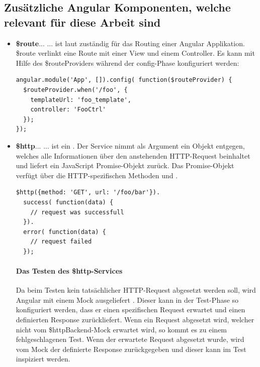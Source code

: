 \subsection{Zusätzliche Angular Komponenten, welche relevant für diese Arbeit sind}
\begin{itemize}
  \item \textbf{\$route}...\linebreak
      ... ist laut \cite{Angular:ServiceRoute} zuständig für das Routing einer Angular Applikation. \$route verlinkt eine Route mit einer View und einem Controller. Es kann mit Hilfe des \$routeProviders während der config-Phase konfiguriert werden:

      \begin{lstlisting}
angular.module('App', []).config( function($routeProvider) {
  $routeProvider.when('/foo', {
    templateUrl: 'foo_template',
    controller: 'FooCtrl'
  });
});
      \end{lstlisting}

  \item \textbf{\$http}...\linebreak
      ... ist ein  \autocite{Angular:ServiceHTTP}. Der Service nimmt als Argument ein Objekt entgegen, welches alle Informationen über den anstehenden HTTP-Request beinhaltet und liefert ein JavaScript Promise-Objekt zurück. Das Promise-Objekt verfügt über die HTTP-spezifischen Methoden  und .

      \begin{lstlisting}
$http({method: 'GET', url: '/foo/bar'}).
  success( function(data) {
    // request was successfull
  }).
  error( function(data) {
    // request failed
  });
      \end{lstlisting}

      \paragraph{Das Testen des \$http-Services}
      Da beim Testen kein tatsächlicher HTTP-Request abgesetzt werden soll, wird Angular mit einem Mock  ausgeliefert \autocite{Angular:MockHTTPBackend}. Dieser kann in der Test-Phase so konfiguriert werden, dass er einen spezifischen Request erwartet und einen definierten Response zurückliefert. Wenn ein Request abgesetzt wird, welcher nicht vom \$httpBackend-Mock erwartet wird, so kommt es zu einem fehlgeschlagenen Test. Wenn der erwartete Request abgesetzt wurde, wird vom Mock der definierte Response zurückgegeben und dieser kann im Test inspiziert werden.


\end{itemize}
